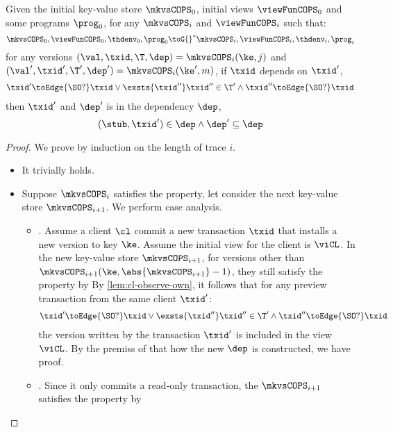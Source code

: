\begin{lemma}
    \label{lem:cops-dep}
    Given the initial key-value store \( \mkvsCOPS_0 \), initial views \( \viewFunCOPS_0 \) and some programs \( \prog_0 \), for any \( \mkvsCOPS_i \) and \( \viewFunCOPS_i \)  such that: 
    \[
        \mkvsCOPS_0, \viewFunCOPS_0, \thdenv_0, \prog_0 {\toG{}}^* \mkvsCOPS_i, \viewFunCOPS_i, \thdenv_i, \prog_i 
    \]
    for any versions \( ( \val,\txid,\T,\dep ) = \mkvsCOPS_i(\ke,j) \) and \( ( \val',\txid',\T',\dep' ) = \mkvsCOPS_i(\ke',m) \), if \( \txid \) depends on \( \txid' \), \ie
    \[
        \begin{array}{@{}l@{}}
            \txid' \toEdge{\SO ?} \txid
            \lor \exsts{\txid''}
            \txid'' \in \T' \land
            \txid'' \toEdge{\SO ?} \txid
        \end{array}
    \]
    then \( \txid' \) and \( \dep' \) is in the dependency \( \dep \), \ie
    \[
        (\stub, \txid') \in \dep \land \dep' \subseteq \dep
    \]
\end{lemma}
\begin{proof}
    We prove by induction on the length of trace \( i \).
    \begin{itemize}
        \item 
        It trivially holds.
        \item  
        Suppose \( \mkvsCOPS_i \) satisfies the property, let consider the next key-value store \( \mkvsCOPS_{i+1}\).
        We perform case analysis.
        \begin{itemize}
            \item 
            .
            Assume a client \( \cl \) commit a new transaction \( \txid \) that installs a new version to key \( \ke \).
            Assume the initial view for the client is \( \viCL \).
            In the new key-value store \( \mkvsCOPS_{i+1} \), for versions other than \( \mkvsCOPS_{i+1}(\ke, \abs{\mkvsCOPS_{i+1}} - 1 ) \), they still satisfy the property by \ih
            By \cref{lem:cl-observe-own}, it follows that for any preview transaction from the same client \( \txid' \):
            \[
                \begin{array}{@{}l@{}}
                    \txid' \toEdge{\SO ?} \txid
                    \lor \exsts{\txid''}
                    \txid'' \in \T' \land
                    \txid'' \toEdge{\SO ?} \txid
                \end{array}
            \]
            the version written by the transaction \( \txid' \) is included in the view \( \viCL \).
            By the premiss of  that how the new \( \dep \) is constructed, we have proof.

            \item 
            .
            Since it only commits a read-only transaction, 
            the \( \mkvsCOPS_{i+1} \)  satisfies the property by \ih
        \end{itemize}
    \end{itemize}
\end{proof}

